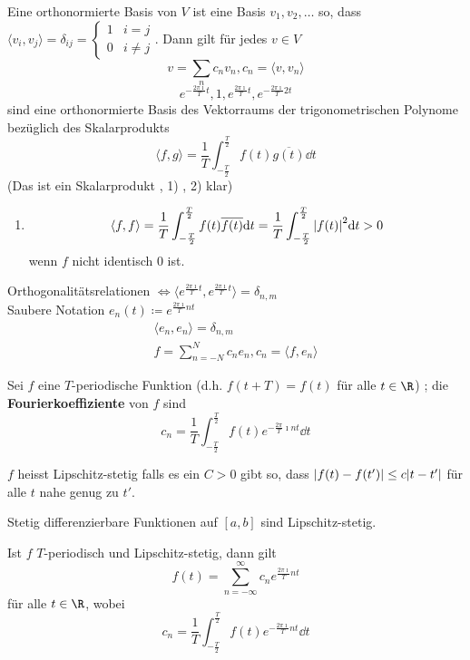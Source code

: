 Eine orthonormierte Basis von $V$ ist eine Basis $v_1, v_2 , \dotsc$ so, dass $\langle v_i , v_j \rangle = \delta_{ij} = \begin{cases} 1 &i = j \\ 0 &i \neq j \end{cases}$. Dann gilt für jedes $v \in V$
\[ v = \sum_n c_n v_n , c_n = \langle v , v_n \rangle \]
\[ e^{-\frac{2\pi\imath}{T} t} , 1 , e^{\frac{2\pi\imath}{T} t} , e^{-\frac{2\pi\imath}{T} 2t} \]
sind eine orthonormierte Basis des Vektorraums der trigonometrischen Polynome bezüglich des Skalarprodukts
\[ \langle f , g \rangle = \frac{1}{T} \int_{-\frac{T}{2}}^{\frac{T}{2}} f(t) \overline{g(t)} \dd t \]
(Das ist ein Skalarprodukt , 1) , 2) klar)
\begin{enumerate}[start=3,label=\arabic*)]
	\item \[ \langle f , f \rangle = \frac{1}{T} \int_{-\frac{T}{2}}^{\frac{T}{2}} f(t) \overline{f(t)} \dd t = \frac{1}{T} \int_{-\frac{T}{2}}^{\frac{T}{2}} \abs{f(t)}^2 \dd t > 0 \] wenn $f$ nicht identisch $0$ ist.
\end{enumerate}
Orthogonalitätsrelationen $\iff \langle e^{\frac{2\pi\imath}{T} t} , e^{\frac{2\pi\imath}{T} t} \rangle = \delta_{n,m}$ \\
Saubere Notation $e_n(t) \coloneqq e^{\frac{2\pi\imath}{T} nt}$
\begin{gather*}
	\langle e_n , e_n \rangle = \delta_{n,m} \\
	f = \sum_{n = -N}^N c_n e_n , c_n = \langle f , e_n \rangle
\end{gather*}
\begin{def*}[note = Fourierkoeffizient , index = Fourier koeffizient , indexformat = {1!~.2}]
	Sei $f$ eine $T$-periodische Funktion (d.h. $f(t+T) = f(t)$ für alle $t \in \R$) ; die \textbf{Fourierkoeffiziente} von $f$ sind
	\[ c_n = \frac{1}{T} \int_{-\frac{T}{2}}^{\frac{T}{2}} f(t) e^{-\frac{2\pi}{T} \imath nt} \dd t \]
\end{def*}
\begin{def*}[note = Lipschitz Stetigkeit , index = Lipschitz stegig , indexformat = {2!1~ }]
	$f$ heisst Lipschitz-stetig falls es ein $C > 0$ gibt so, dass $\abs{f(t) - f(t')} \leq c \abs{t-t'}$ für alle $t$ nahe genug zu $t'$.
\end{def*}
\begin{bsp*}
	Stetig differenzierbare Funktionen auf $[a,b]$ sind Lipschitz-stetig.
\end{bsp*}
\begin{satz*}
	Ist $f$ $T$-periodisch und Lipschitz-stetig, dann gilt
	\[ f(t) = \sum_{n = -\infty}^\infty c_n e^{\frac{2\pi\imath}{T} nt} \]
	für alle $t \in \R$, wobei
	\[ c_n = \frac{1}{T} \int_{-\frac{T}{2}}^{\frac{T}{2}} f(t) e^{-\frac{2\pi\imath}{T} nt} \dd t \]
\end{satz*}
